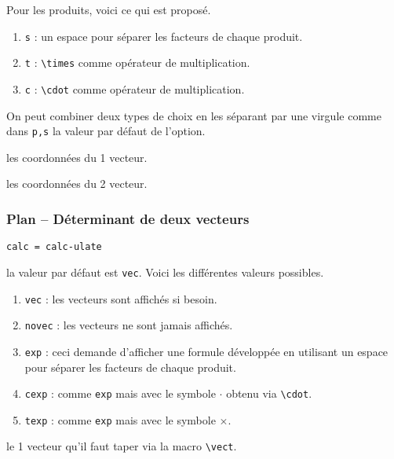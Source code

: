 \documentclass[12pt,a4paper]{article}
\newcommand\env[1]{\texttt{#1}}
\newcommand\macro[1]{\env{\textbackslash{}#1}}
\theoremstyle{definition}
\newcommand\mwhyprefix[2]{%
	\texttt{#1 = #1-#2}%
}
\newcommand\prefix[1]{%
	\texttt{#1}%
}
\begin{document}
            Pour les produits, voici ce qui est proposé.
\begin{enumerate}
	\item \prefix{s} : un espace pour séparer les facteurs de chaque produit.

	\item \prefix{t} : \macro{times} comme opérateur de multiplication.

	\item \prefix{c} : \macro{cdot} comme opérateur de multiplication.
\end{enumerate}

            On peut combiner deux types de choix en les séparant par une virgule comme dans \verb+p,s+ la valeur par défaut de l'option.


 les coordonnées du 1\ier{} vecteur.

 les coordonnées du 2\ieme{} vecteur.


\subsubsection{Plan -- Déterminant de deux vecteurs} \label{tnsgeo-colinearity-criteria}



 \hfill \mwhyprefix{calc}{ulate}



\IDoption{} la valeur par défaut est \verb+vec+. Voici les différentes valeurs possibles.
\begin{enumerate}
	\item \verb+vec+ : les vecteurs sont affichés si besoin.

	\item \verb+novec+ : les vecteurs ne sont jamais affichés.

	\item \verb+exp+ : ceci demande d'afficher une formule développée en utilisant un espace pour séparer les facteurs de chaque produit.

	\item \verb+cexp+ : comme \verb+exp+ mais avec le symbole $\cdot$ obtenu via \macro{cdot}.

	\item \verb+texp+ : comme \verb+exp+ mais avec le symbole $\times$.
\end{enumerate}


 le 1\ier{} vecteur qu'il faut taper via la macro \macro{vect}.
\end{document}
